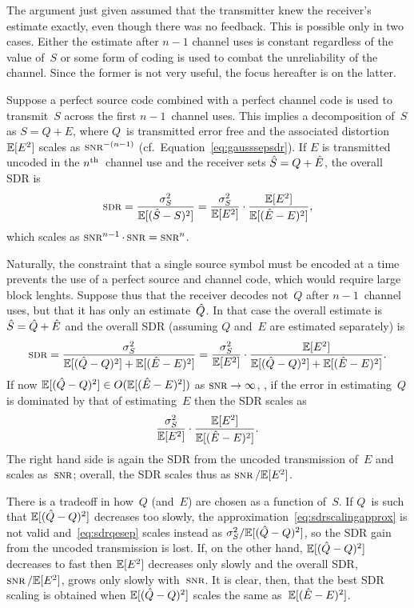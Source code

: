 The argument just given assumed that the transmitter knew the receiver's
estimate exactly, even though there was no feedback. This is possible only in
two cases.  Either the estimate after $n-1$ channel uses is constant regardless
of the value of~$S$ or some form of coding is used to combat the unreliability
of the channel. Since the former is not very useful, the focus hereafter is on
the latter.

Suppose a perfect source code combined with a perfect channel code is
used to transmit~$S$ across the first $n-1$~channel uses. This implies a
decomposition of~$S$ as $S = Q + E$, where $Q$~is transmitted error free and
the associated distortion $\mathbb{E}[E^2]$ scales as $\snr^{-(n-1)}$
(cf.~Equation~\vref{eq:gausssepsdr}). If $E$ is transmitted uncoded in the
$n{^{\text{th}}}$~channel use and the receiver sets ${\hat{S}} = Q + \hat{E}$, the overall SDR is
\begin{equation*}
  \sdr = \frac{\ssq}{\mse} = \frac{\ssq}{\E[E^2]} \cdot \frac{\E[E^2]}{\E[(\Eh -
  E)^2]},
\end{equation*}
which scales as $\snr^{n-1} \cdot \snr = \snr^n$. 

Naturally, the constraint that a single source symbol must be encoded at a
time prevents the use of a perfect source and channel code, which would require
large block lenghts. Suppose thus that
the receiver decodes not~$Q$ after $n-1$~channel uses, but that it has only an
estimate~$\hat{Q}$. In that case the overall estimate is ${\hat{S}} = \hat{Q} + \hat{E}$ and the
overall SDR (assuming $Q$ and~$E$ are estimated separately) is
\begin{equation}
  \label{eq:sdrqesep}
  \sdr = \frac{\ssq}{\mseq + \msee} =
  \frac{\ssq}{\E[E^2]} \cdot \frac{\E[E^2]}{\mseq + \E[(\Eh - E)^2]}.
\end{equation}
If now ${\mathbb{E}[(\hat{Q} - Q)^2]} \in O({\mathbb{E}[(\hat{E} - E)^2]})$ as $\snr \goesto \infty$, \ie,
if the error in estimating~$Q$ is dominated by that of estimating~$E$ then
the SDR scales as
\begin{equation}
  \label{eq:sdrscalingapprox}
  \frac{{\sigma_S^2}}{\mathbb{E}[E^2]} \cdot \frac{\mathbb{E}[E^2]}{{\mathbb{E}[(\hat{E} - E)^2]}}.
\end{equation}
The right hand side is again the SDR from the uncoded transmission of~$E$ and
scales as~$\snr$; overall, the SDR scales thus as $\snr / \E[E^2]$.

There is a tradeoff in how~$Q$ (and~$E$) are chosen as a function of~$S$. If
$Q$~is such that
${\mathbb{E}[(\hat{Q} - Q)^2]}$ decreases too slowly, the approximation~\eqref{eq:sdrscalingapprox}
is not valid and~\eqref{eq:sdrqesep} scales instead as ${\sigma_S^2} / {\mathbb{E}[(\hat{Q} - Q)^2]}$, so the
SDR gain from the uncoded transmission is lost.  If, on the other hand, ${\mathbb{E}[(\hat{Q} - Q)^2]}$
decreases to fast then $\mathbb{E}[E^2]$ decreases only slowly and the overall SDR,
$\snr / \E[E^2]$, grows only slowly with~$\snr$. It is clear, then, that the
best SDR scaling is obtained when ${\mathbb{E}[(\hat{Q} - Q)^2]}$ scales the same as~${\mathbb{E}[(\hat{E} - E)^2]}$.

